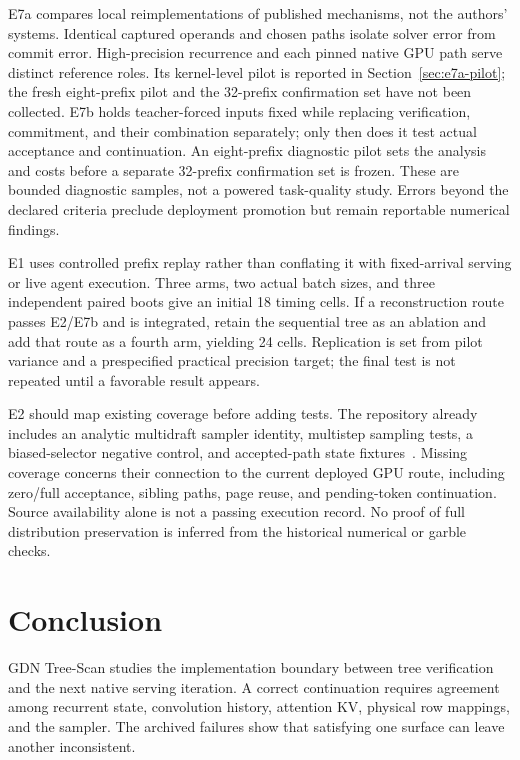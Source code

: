 \documentclass[conference]{IEEEtran}
\newcommand{\sys}{GDN Tree-Scan}
\begin{document}
E7a compares local reimplementations of published mechanisms, not the authors' systems. Identical captured operands and chosen paths isolate solver error from commit error. High-precision recurrence and each pinned native GPU path serve distinct reference roles. Its kernel-level pilot is reported in Section~\ref{sec:e7a-pilot}; the fresh eight-prefix pilot and the 32-prefix confirmation set have not been collected. E7b holds teacher-forced inputs fixed while replacing verification, commitment, and their combination separately; only then does it test actual acceptance and continuation. An eight-prefix diagnostic pilot sets the analysis and costs before a separate 32-prefix confirmation set is frozen. These are bounded diagnostic samples, not a powered task-quality study. Errors beyond the declared criteria preclude deployment promotion but remain reportable numerical findings.

E1 uses controlled prefix replay rather than conflating it with fixed-arrival serving or live agent execution. Three arms, two actual batch sizes, and three independent paired boots give an initial 18 timing cells. If a reconstruction route passes E2/E7b and is integrated, retain the sequential tree as an ablation and add that route as a fourth arm, yielding 24 cells. Replication is set from pilot variance and a prespecified practical precision target; the final test is not repeated until a favorable result appears.

E2 should map existing coverage before adding tests. The repository already includes an analytic multidraft sampler identity, multistep sampling tests, a biased-selector negative control, and accepted-path state fixtures~\cite{lumo2026archive}. Missing coverage concerns their connection to the current deployed GPU route, including zero/full acceptance, sibling paths, page reuse, and pending-token continuation. Source availability alone is not a passing execution record. No proof of full distribution preservation is inferred from the historical numerical or garble checks.

\section{Conclusion}
\sys{} studies the implementation boundary between tree verification and the next native serving iteration. A correct continuation requires agreement among recurrent state, convolution history, attention KV, physical row mappings, and the sampler. The archived failures show that satisfying one surface can leave another inconsistent.
\end{document}
